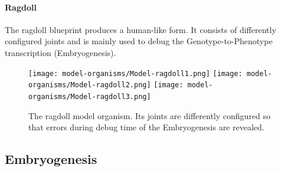 \documentclass[main]{subfiles}
\begin{document}
\paragraph{Ragdoll}

The ragdoll blueprint produces a human-like form. %
%
It consists of differently configured joints and is mainly used to debug the Genotype-to-Phenotype transcription (Embryogenesis).

\begin{figure}[H]
\centering
\texttt{[image: model-organisms/Model-ragdoll1.png]}
\texttt{[image: model-organisms/Model-ragdoll2.png]}
\texttt{[image: model-organisms/Model-ragdoll3.png]}
\caption[The ragdoll]{The ragdoll model organism. Its joints are differently configured so that errors during debug time of the Embryogenesis are revealed.}
\label{figure:ragdoll}
\end{figure}

\subsection{Embryogenesis}
\label{subsec:embryogenesis}
\end{document}
